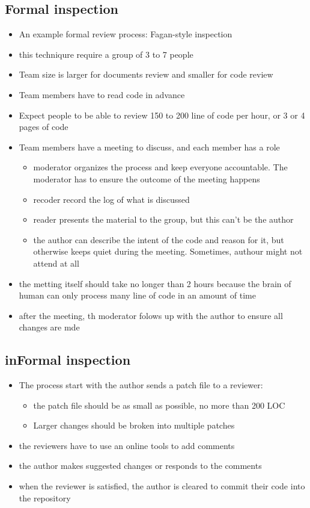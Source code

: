 \documentclass{article}
\begin{document}
 \subsection{Formal inspection}
 \begin{itemize}
   \item An example formal review process: Fagan-style inspection
   \item this techniqure require a group of 3 to 7 people
   \item Team size is larger for documents review and smaller for code review
   \item Team members have to read code in advance
   \item Expect people to be able to review 150 to 200 line of code per hour, or
   3 or 4 pages of code
   \item Team members have a meeting to discuss, and each member has a role 
   \begin{itemize}
     \item moderator organizes the process and keep everyone accountable. The
     moderator has to ensure the outcome of the meeting happens
     \item recoder record the log of what is discussed
     \item reader presents the material to the group, but this can't be the
     author
     \item the author can describe the intent of the code and reason for it, but
     otherwise keeps quiet during the meeting. Sometimes, authour might not
     attend at all
   \end{itemize}
   \item the metting itself should take no longer than 2 hours because the brain
   of human can only process many line of code in an amount of time
   \item after the meeting, th moderator folows up with the author to ensure all
   changes are mde
 \end{itemize}
 
 \subsection{inFormal inspection}
 \begin{itemize}
   \item The process start with the author sends a patch file to a reviewer:
   \begin{itemize}
     \item the patch file should be as small as possible, no more than 200 LOC
     \item Larger changes should be broken into multiple patches
   \end{itemize}
   \item the reviewers have to use an online tools to add comments
   \item the author makes suggested changes or responds to the comments
   \item when the reviewer is satisfied, the author is cleared to commit their
   code into the repository
 \end{itemize}
 
\end{document}
